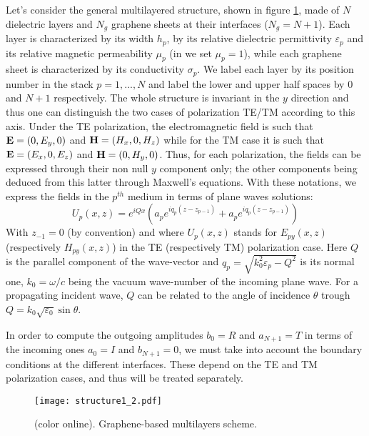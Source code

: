 \documentclass[aps,pra,superscriptaddress,amsmath,amssymb,showpacs,twocolumn,notitlepage]{revtex4-1}
\begin{document}
Let's consider the general multilayered structure, shown in figure \ref{structure_2}, made of $N$ dielectric layers and $N_g$ graphene sheets at their interfaces ($N_g=N+1$). Each layer is characterized by its width $h_p$, by its relative dielectric permittivity $\varepsilon_p$ and its relative magnetic permeability $\mu_p$ (in \cite{Chahine2017} we set $\mu_p=1$),  while each graphene sheet is characterized by its conductivity $\sigma_p$. We label each layer by its position number in the stack $p=1,...,N$ and label the lower and upper half spaces by $0$ and $N+1$ respectively. The whole structure is invariant in the $y$ direction and thus one can distinguish the two cases of polarization TE/TM according to this axis. Under the TE polarization, the electromagnetic field is such that ${\bf E}=(0,E_y,0)$ and ${\bf H}=(H_x,0,H_z)$ while for the TM case it is such that ${\bf E}=(E_x,0,E_z)$ and ${\bf H}=(0,H_y,0)$. Thus, for each polarization, the fields can be expressed through their non null $y$ component only; the other components being deduced from this latter through Maxwell's equations. 
With these notations, we express the fields in the $p^{th}$ medium in terms of plane waves solutions:
%
\begin{equation} \label{Eq:Fields}
 U_p(x,z)=e^{iQ x} \left(a_pe^{iq_p (z-z_{p-1})} + a_pe^{iq_p (z-z_{p-1})} \right)
\end{equation}
%
With $z_{-1}=0$ (by convention) and where $U_p(x,z)$ stands for $E_{py}(x,z)$ (respectively $H_{py}(x,z)$) in the TE (respectively TM) polarization case. Here $Q$ is the parallel component of the wave-vector and $q_p=\sqrt{k_0^2\varepsilon_p-Q^2}$ is its normal one, $k_0=\omega/c$ being the vacuum wave-number of the incoming plane wave. For a propagating incident wave, $Q$ can be related to the angle of incidence $\theta$ trough $Q=k_0\sqrt{\varepsilon_0} \sin{\theta}$.      
 
In order to compute the outgoing amplitudes $b_0=R $   and $a_{N+1}=T$ in terms of the incoming ones $a_0=I$  and $b_{N+1}=0$, we must take into account the boundary conditions at the different interfaces. These depend on the TE and TM polarization cases, and thus will be treated separately. 



\begin{figure}[htb] 
\texttt{[image: structure1\_2.pdf]}
\caption{\footnotesize (color online). Graphene-based multilayers scheme. 
\label{structure_2}}
\end{figure}
\end{document}
